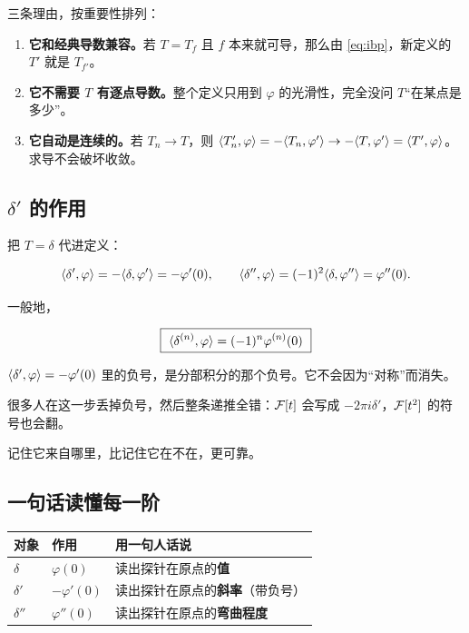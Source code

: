 \begin{ideabox}
三条理由，按重要性排列：
\begin{enumerate}[leftmargin=1.4em,itemsep=0.25em]
\item \textbf{它和经典导数兼容。}若 $T=T_f$ 且 $f$ 本来就可导，那么由 \eqref{eq:ibp}，新定义的 $T'$ 就是 $T_{f'}$。
\item \textbf{它不需要 $T$ 有逐点导数。}整个定义只用到 $\varphi$ 的光滑性，完全没问 $T$“在某点是多少”。
\item \textbf{它自动是连续的。}若 $T_n\to T$，则 $\langle T_n',\varphi\rangle=-\langle T_n,\varphi'\rangle\to-\langle T,\varphi'\rangle=\langle T',\varphi\rangle$。求导不会破坏收敛。
\end{enumerate}
\end{ideabox}

\subsection{$\delta'$ 的作用}

把 $T=\delta$ 代进定义：

\begin{equation}
\langle \delta',\varphi\rangle=-\langle \delta,\varphi'\rangle=-\varphi'(0),
\qquad
\langle \delta'',\varphi\rangle=(-1)^{2}\langle \delta,\varphi''\rangle=\varphi''(0).
\end{equation}

一般地，

\begin{equation}
\boxed{\ \ip{\delta^{(n)}}{\varphi}=(-1)^{n}\varphi^{(n)}(0)\ }\label{eq:delta-n}
\end{equation}

\begin{warnbox}[负号不是笔误]
$\langle \delta',\varphi\rangle=-\varphi'(0)$ 里的负号，是分部积分的那个负号。它不会因为“对称”而消失。

很多人在这一步丢掉负号，然后整条递推全错：$\mathcal{F}[t]$ 会写成 $-2\pi i\delta'$，$\mathcal{F}[t^{2}]$ 的符号也会翻。

记住它来自哪里，比记住它在不在，更可靠。
\end{warnbox}

\subsection{一句话读懂每一阶}

\begin{center}
\small
\renewcommand{\arraystretch}{1.4}
\begin{tabularx}{\textwidth}{@{}L{2.6cm}L{4.4cm}Y@{}}
\toprule
对象 & 作用 & 用一句人话说 \\
\midrule
$\delta$ & $\varphi(0)$ & 读出探针在原点的\textbf{值} \\
$\delta'$ & $-\varphi'(0)$ & 读出探针在原点的\textbf{斜率}（带负号） \\
$\delta''$ & $\varphi''(0)$ & 读出探针在原点的\textbf{弯曲程度} \\
\bottomrule
\end{tabularx}
\end{center}

